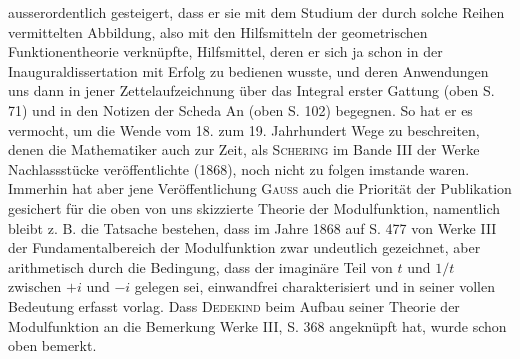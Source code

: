 ausserordentlich gesteigert, dass er sie mit dem Studium der durch
solche Reihen vermittelten Abbildung, also mit den Hilfsmitteln der geometrischen
Funktionentheorie verknüpfte, Hilfsmittel, deren er sich ja schon in
der Inauguraldissertation mit Erfolg zu bedienen wusste, und deren Anwendungen
uns dann in jener Zettelaufzeichnung über das Integral erster Gattung
(oben S. 71) und in den Notizen der Scheda An (oben S. 102) begegnen. So
hat er es vermocht, um die Wende vom 18. zum 19. Jahrhundert Wege zu
beschreiten, denen die Mathematiker auch zur Zeit, als \textsc{Schering} im Bande III
der Werke Nachlassstücke veröffentlichte (1868), noch nicht zu folgen imstande
waren. Immerhin hat aber jene Veröffentlichung \textsc{Gauss} auch die Priorität
der Publikation gesichert für die oben von uns skizzierte Theorie der Modulfunktion,
namentlich bleibt z. B. die Tatsache bestehen, dass im Jahre 1868
auf S. 477 von Werke III der Fundamentalbereich der Modulfunktion zwar
undeutlich gezeichnet, aber arithmetisch durch die Bedingung, dass der imaginäre
Teil von \(t\) und \(1/t\) zwischen \(+i\) und \(-i\) gelegen sei, einwandfrei charakterisiert
und in seiner vollen Bedeutung erfasst vorlag. Dass \textsc{Dedekind}
beim Aufbau seiner Theorie der Modulfunktion an die Bemerkung Werke III,
S. 368 angeknüpft hat, wurde schon oben bemerkt.
